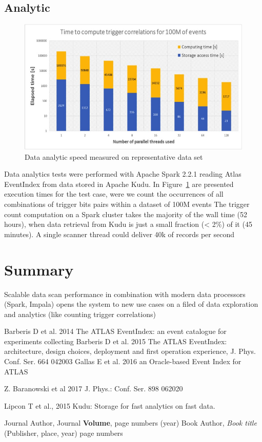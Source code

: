 \documentclass{webofc}
\begin{document}
\subsection{Analytic}
\label{sec-6-an}
\begin{figure}
\centering
\includegraphics[width=\linewidth,clip]{analytics.jpg}
\caption{Data analytic speed measured on representative data set}
\label{fig:analytics}
\end{figure}
Data analytics tests were performed with Apache Spark 2.2.1 reading Atlas EventIndex from data stored in Apache Kudu.
In Figure~\ref{fig:analytics} are presented execution times for the test case, were we count the occurrences of all combinations of trigger bits pairs within a dataset of 100M events
The trigger count computation on a Spark cluster takes the majority of the wall time (52 hours), when data retrieval from Kudu is just a small fraction (< 2\%) of it (45 minutes). A single scanner thread could deliver 40k of records per second


\section{Summary}
\label{sec-7}
Scalable data scan performance in combination with modern data processors (Spark, Impala) opens the system to new use cases on a filed of data exploration and analytics (like counting trigger correlations)



\begin{thebibliography}{}

Barberis D et al. 2014 The ATLAS EventIndex: an event catalogue for experiments collecting 
Barberis D et al. 2015 The ATLAS EventIndex: architecture, design choices, deployment and first operation experience, J. Phys. Conf. Ser. 664 042003
Gallas E et al. 2016 an Oracle-based Event Index for ATLAS

Z. Baranowski et al 2017 J. Phys.: Conf. Ser. 898 062020

Lipcon T et al., 2015 Kudu: Storage for fast analytics on fast data.





Journal Author, Journal \textbf{Volume}, page numbers (year)
Book Author, \textit{Book title} (Publisher, place, year) page numbers
\end{thebibliography}
\end{document}
